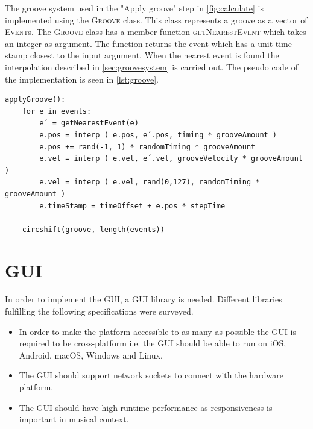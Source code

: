The groove system used in the "Apply groove" step in \cref{fig:calculate} is implemented using the \textsc{Groove} class. This class represents a groove as a vector of \textsc{Event}s. The \textsc{Groove} class has a member function \textsc{getNearestEvent} which takes an integer as argument. The function returns the event which has a unit time stamp closest to the input argument. When the nearest event is found the interpolation described in \cref{sec:groovesystem} is carried out. The pseudo code of the implementation is seen in \cref{lst:groove}.

\begin{lstlisting}[caption={Pseudo code of "Apply groove" step \tdr{caption}},label={lst:groove},float,floatplacement=H]
applyGroove():
    for e in events:
        e´ = getNearestEvent(e)
        e.pos = interp ( e.pos, e´.pos, timing * grooveAmount )
        e.pos += rand(-1, 1) * randomTiming * grooveAmount
        e.vel = interp ( e.vel, e´.vel, grooveVelocity * grooveAmount )
        e.vel = interp ( e.vel, rand(0,127), randomTiming * grooveAmount )
        e.timeStamp = timeOffset + e.pos * stepTime
        
    circshift(groove, length(events))
\end{lstlisting}


\section{GUI} %
\label{sec:guiimplementation}

In order to implement the GUI, a GUI library is needed. Different libraries fulfilling the following specifications were surveyed.

\begin{itemize}
    \item In order to make the platform accessible to as many as possible the GUI is required to be cross-platform i.e. the GUI should be able to run on iOS, Android, macOS, Windows and Linux.
    \item The GUI should support network sockets to connect with the hardware platform.
    \item The GUI should have high runtime performance as responsiveness is important in musical context. 
\end{itemize}

